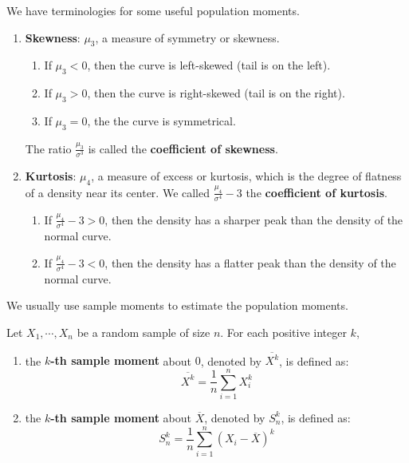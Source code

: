 \documentclass{huhtakm-template-book-v2}
\begin{document}
\newpage
\begin{eg}
	We have terminologies for some useful population moments.
	\begin{enumerate}
		\item \textbf{Skewness}: $\mu_{3}$, a measure of symmetry or skewness.
		\begin{enumerate}
			\item If $\mu_{3}<0$, then the curve is left-skewed (tail is on the left).
			\item If $\mu_{3}>0$, then the curve is right-skewed (tail is on the right).
			\item If $\mu_{3}=0$, the the curve is symmetrical.
		\end{enumerate}
		The ratio $\frac{\mu_{3}}{\sigma^{3}}$ is called the \textbf{coefficient of skewness}.
		\item \textbf{Kurtosis}: $\mu_{4}$, a measure of excess or kurtosis, which is the degree of flatness of a density near its center. We called $\frac{\mu_{4}}{\sigma^{4}}-3$ the \textbf{coefficient of kurtosis}.
		\begin{enumerate}
			\item If $\frac{\mu_{4}}{\sigma^{4}}-3>0$, then the density has a sharper peak than the density of the normal curve.
			\item If $\frac{\mu_{4}}{\sigma^{4}}-3<0$, then the density has a flatter peak than the density of the normal curve.
		\end{enumerate}
	\end{enumerate}
\end{eg}
We usually use sample moments to estimate the population moments.
\begin{defn}
	Let $X_{1},\cdots,X_{n}$ be a random sample of size $n$. For each positive integer $k$,
	\begin{enumerate}
		\item the \textbf{$k$-th sample moment} about $0$, denoted by $\overline{X^{k}}$, is defined as:
		\begin{equation*}
			\overline{X^{k}}=\frac{1}{n}\sum_{i=1}^{n}X_{i}^{k}
		\end{equation*}
		\item the \textbf{$k$-th sample moment} about $\overline{X}$, denoted by $S_{n}^{k}$, is defined as:
		\begin{equation*}
			S_{n}^{k}=\frac{1}{n}\sum_{i=1}^{n}(X_{i}-\overline{X})^{k}
		\end{equation*}
	\end{enumerate}
\end{defn}
\end{document}
